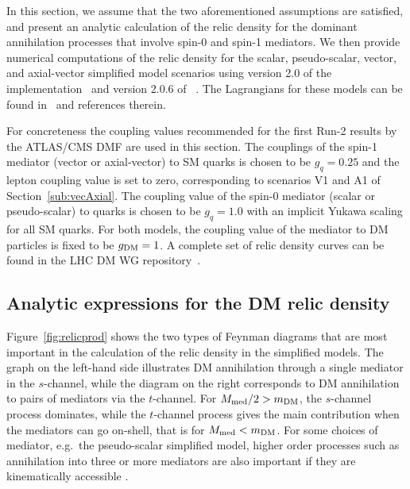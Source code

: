 
In this section, we assume that the two aforementioned assumptions are satisfied, and  present an analytic calculation of the relic density for the dominant annihilation processes that involve spin-0 and spin-1 mediators. We then provide numerical computations of the relic density for the  scalar, pseudo-scalar, vector, and axial-vector simplified model scenarios using version 2.0 of the \dmsimp implementation~\cite{DMsimp}
and version 2.0.6 of \maddm~\cite{Backovic:2013dpa,Backovic:2015tpt}. The Lagrangians for these models can be found in~\cite{Boveia:2016mrp} and references therein. 

For concreteness  the coupling values recommended for the first Run-2 results by the ATLAS/CMS %
DMF are used in this section. The couplings of the spin-1 mediator (vector or axial-vector) to SM quarks is chosen to be $g_q = 0.25$ and the lepton coupling value is set to zero, corresponding to scenarios V1 and A1 of Section~\ref{sub:vecAxial}. The coupling value of the spin-0 mediator (scalar or pseudo-scalar) to quarks is chosen to be $g_q=1.0$ with an implicit Yukawa scaling for all SM quarks. For both models, the coupling value of the mediator to DM particles is fixed to be $g_{\rm DM}=1$.
A complete set of relic density curves can be found in the LHC DM WG repository~\cite{RelicRepo}.

\subsection{Analytic expressions for the DM relic density}
\label{analyticrelic}

Figure~\ref{fig:relicprod} shows the two %
types of Feynman diagrams that are 
%
most important in the calculation of the relic density in the simplified models. %
The graph on the left-hand side illustrates DM annihilation through a single mediator in the $s$-channel, while the diagram on the right corresponds to DM annihilation to pairs of mediators via the $t$-channel.
For $M_{\rm med}/2 > m_{\rm DM}$, the $s$-channel process dominates, while the $t$-channel process gives the main contribution when the mediators can go on-shell, that is for $M_{\rm med} < m_{\rm DM}$. For some choices of mediator, e.g.~the pseudo-scalar simplified model, higher
order processes such as annihilation into three or
more mediators are also important if they are kinematically accessible \cite{Abdullah:2014lla}.

